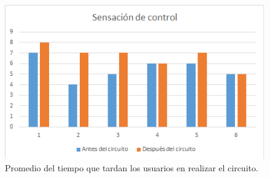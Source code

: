 \documentclass[twoside, 12pt]{epstfg}
\begin{document}
\begin{itemize}
\begin{figure}[H]
	\centerline{
		\mbox{\includegraphics[width=.85\textwidth]{images/SensacionControl.png}}
	}
	\caption{Promedio del tiempo que tardan los usuarios en realizar el circuito.}
\end{figure}



\end{itemize}
%
%
%
%
%
%
%
%
\end{document}
